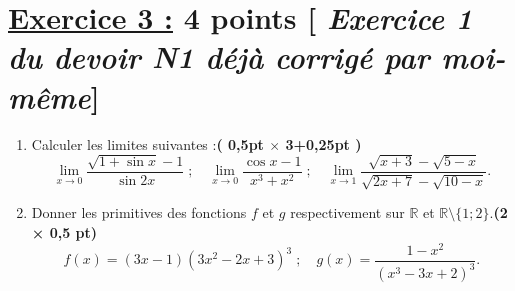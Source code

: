 \documentclass[12pt,a4paper]{article}
\begin{document}
\section*{\underline{Exercice 3 :} 4 points [\textit{ Exercice 1  du devoir N1 déjà  corrigé par moi-même}]}

\begin{enumerate}
    \item Calculer les limites suivantes :\hfill \textbf{( 0,5pt $\times$ 3+0,25pt )}
    \[
    \lim_{x \to 0} \frac{\sqrt{1+\sin x} - 1}{\sin 2x} \; ; \quad
    \lim_{x \to 0} \frac{\cos x - 1}{x^3 + x^2} \; ; \quad
    \lim_{x \to 1} \frac{\sqrt{x + 3} - \sqrt{5 - x}}{\sqrt{2x + 7} - \sqrt{10 - x}}.
    \]
    \item Donner les primitives des fonctions \(f\) et \(g\) respectivement sur \(\mathbb{R}\) et \(\mathbb{R} \setminus \{1; 2\}\).\hfill \textbf{(2 × 0,5 pt)}
    \[
    f(x) = (3x-1)(3x^2-2x+3)^3 \; ; \quad
    g(x) = \frac{1-x^2}{(x^3-3x+2)^3}.
    \]
\end{enumerate}
\end{document}
